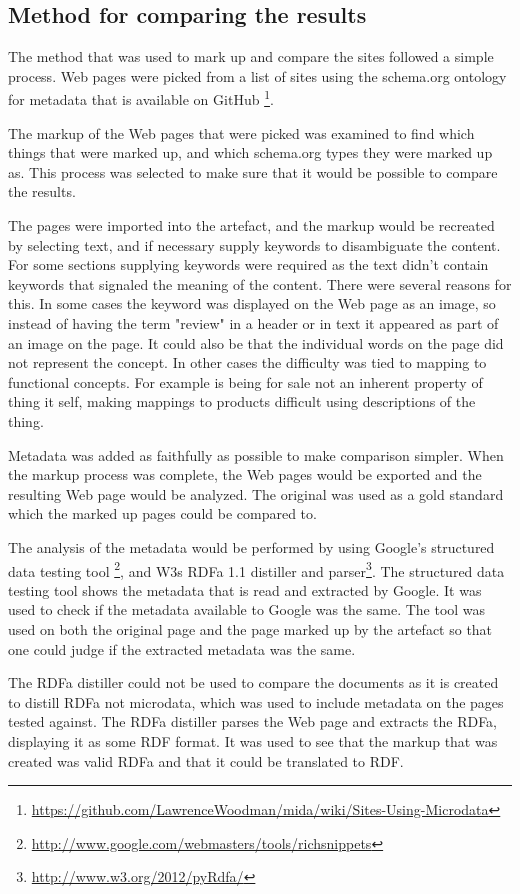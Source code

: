 \subsection{Method for comparing the results}
The method that was used to mark up and compare the sites followed a simple process.
Web pages were picked from a list of sites using the schema.org ontology for metadata that is available on GitHub
\footnote{\url{https://github.com/LawrenceWoodman/mida/wiki/Sites-Using-Microdata}}.

The markup of the Web pages that were picked was examined to find which things that were marked up,
and which schema.org types they were marked up as.
This process was selected to make sure that it would be possible to compare the results.

The pages were imported into the artefact, and the markup would be recreated by selecting text,
and if necessary supply keywords to disambiguate the content.
For some sections supplying keywords were required as the text didn't contain keywords that signaled the meaning of the content.
There were several reasons for this.
In some cases the keyword was displayed on the Web page as an image,
so instead of having the term "review" in a header or in text it appeared as part of an image on the page.
It could also be that the individual words on the page did not represent the concept.
In other cases the difficulty was tied to mapping to functional concepts.
For example is being for sale not an inherent property of thing it self,
making mappings to products difficult using descriptions of the thing.

Metadata was added as faithfully as possible to make comparison simpler.
When the markup process was complete, the Web pages would be exported and the resulting Web page would be analyzed.
The original was used as a gold standard which the marked up pages could be compared to.

The analysis of the metadata would be performed by using Google's structured data testing tool
\footnote{\url{http://www.google.com/webmasters/tools/richsnippets}},
and W3s RDFa 1.1 distiller and parser\footnote{\url{http://www.w3.org/2012/pyRdfa/}}.
The structured data testing tool shows the metadata that is read and extracted by Google.
It was used to check if the metadata available to Google was the same.
The tool was used on both the original page and the page marked up by the artefact so that one could judge if the
extracted metadata was the same.

The RDFa distiller could not be used to compare the documents as it is created to distill RDFa not microdata,
which was used to include metadata on the pages tested against.
The RDFa distiller parses the Web page and extracts the RDFa, displaying it as some RDF format.
It was used to see that the markup that was created was valid RDFa and that it could be translated to RDF.

